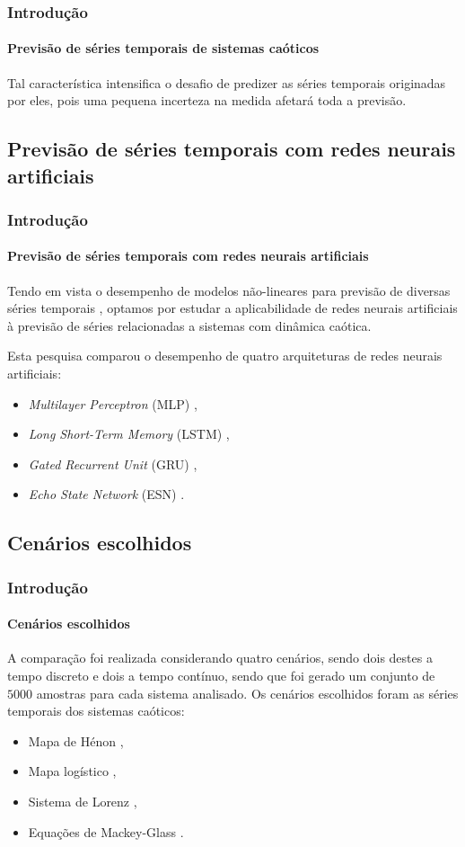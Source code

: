 \documentclass[aspectratio=169]{beamer}
\begin{document}
\begin{frame}
    \frametitle{Introdução}
    \framesubtitle{Previsão de séries temporais de sistemas caóticos}
    \justifying Tal característica intensifica o desafio de predizer as séries temporais originadas por eles, pois uma pequena incerteza na medida afetará toda a previsão. 

\end{frame}

\subsection{Previsão de séries temporais com redes neurais artificiais}

\begin{frame}
    \frametitle{Introdução}
    \framesubtitle{Previsão de séries temporais com redes neurais artificiais}
    \justifying Tendo em vista o desempenho de modelos não-lineares para previsão de diversas séries temporais \cite{connor1994recurrent}, optamos por estudar a aplicabilidade de redes neurais artificiais à previsão de séries relacionadas a sistemas com dinâmica caótica. 
    
    Esta pesquisa comparou o desempenho de quatro arquiteturas de redes neurais artificiais:
    
    \begin{itemize}[<+-| alert@+>]
	\item \textit{Multilayer Perceptron} (MLP) \cite{rosenblatt1958perceptron},
	\item \textit{Long Short-Term Memory} (LSTM) \cite{connor1994recurrent},
	\item \textit{Gated Recurrent Unit} (GRU) \cite{cho2014learning},
	\item \textit{Echo State Network} (ESN) \cite{jaeger2007echo}.
    \end{itemize} 
\end{frame}

\subsection{Cenários escolhidos}

\begin{frame}
    \frametitle{Introdução}
    \framesubtitle{Cenários escolhidos}
    \justifying A comparação foi realizada considerando quatro cenários, sendo dois destes a tempo discreto e dois a tempo contínuo, sendo que foi gerado um conjunto de $5000$ amostras para cada sistema analisado. Os cenários escolhidos foram as séries temporais dos sistemas caóticos:

    \begin{itemize}[<+-| alert@+>]    
    \item Mapa de Hénon \cite{henon1976two},
    \item Mapa logístico \cite{may1976simple},
    \item Sistema de Lorenz \cite{lorenz1963deterministic},
    \item Equações de Mackey-Glass \cite{mackey1977oscillation}.
    \end{itemize}
\end{frame}
\end{document}
